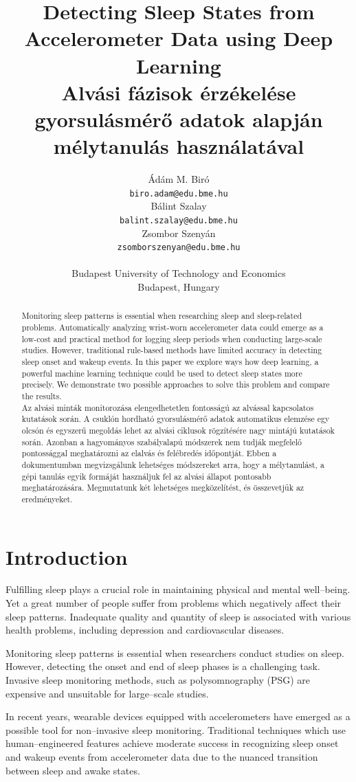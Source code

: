 \documentclass{article}
\title{
  Detecting Sleep States from Accelerometer Data using Deep Learning\\[1ex]
  Alvási fázisok érzékelése gyorsulásmérő adatok alapján mélytanulás használatával
}
\author{%
  Ádám M. Biró \\
  \texttt{biro.adam@edu.bme.hu} \\
  \And
  Bálint Szalay \\
  \texttt{balint.szalay@edu.bme.hu} \\
  \And
  Zsombor Szenyán \\
  \texttt{zsomborszenyan@edu.bme.hu} \\
  \AND
  \\
  Budapest University of Technology and Economics\\
  Budapest, Hungary \\
}
\begin{document}
\maketitle

\begin{abstract}
  Monitoring sleep patterns is essential when researching sleep and sleep-related problems. Automatically analyzing wrist-worn accelerometer data could emerge as a low-cost and practical method for logging sleep periods when conducting large-scale studies. However, traditional rule-based methods have limited accuracy in detecting sleep onset and wakeup events. In this paper we explore ways how deep learning, a powerful machine learning technique could be used to detect sleep states more precisely. We demonstrate two possible approaches to solve this problem and compare the results.\\[2ex]
  Az alvási minták monitorozása elengedhetetlen fontosságú az alvással kapcsolatos kutatások során. A csuklón hordható gyorsulásmérő adatok automatikus elemzése egy olcsón és egyszerű megoldás lehet az alvási ciklusok rögzítésére nagy mintájú kutatások során. Azonban a hagyományos szabályalapú módszerek nem tudják megfelelő pontossággal meghatározni az elalvás és felébredés időpontját. Ebben a dokumentumban megvizsgálunk lehetséges módszereket arra, hogy a mélytanulást, a gépi tanulás egyik formáját használjuk fel az alvási állapot pontosabb meghatározására. Megmutatunk két lehetséges megközelítést, és összevetjük az eredményeket.
\end{abstract}

\section{Introduction}

Fulfilling sleep plays a crucial role in maintaining physical and mental well–being. Yet a great number of people suffer from problems which negatively affect their sleep patterns. Inadequate quality and quantity of sleep is associated with various health problems, including depression and cardiovascular diseases.

Monitoring sleep patterns is essential when researchers conduct studies on sleep. However, detecting the onset and end of sleep phases is a challenging task. Invasive sleep monitoring methods, such as polysomnography (PSG) are expensive and unsuitable for large–scale studies.

In recent years, wearable devices equipped with accelerometers have emerged as a possible tool for non–invasive sleep monitoring. Traditional techniques which use human–engineered features achieve moderate success in recognizing sleep onset and wakeup events from accelerometer data due to the nuanced transition between sleep and awake states.
\end{document}
